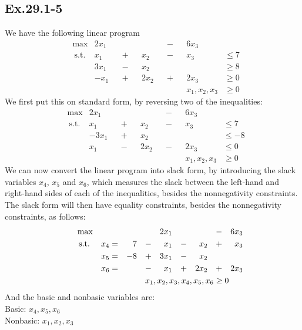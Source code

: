 \subsection*{Ex.29.1-5}

We have the following linear program
$$
\begin{aligned}
 & \max & 2x_1 && && && - && 6x_3 & 
\\
 & \ \text{s.t.} & x_1 && + && x_2 && - && x_3 & \leq 7
\\
 & & 3x_1 && - && x_2 && && & \geq 8
\\
 & & -x_1 && + && 2x_2 && + && 2x_3 & \geq 0
\\
 & & && && && && x_1,x_2,x_3 & \geq 0
\end{aligned}
$$
We first put this on standard form, by reversing two of the inequalities:
$$
\begin{aligned}
 & \max & 2x_1 && && && - && 6x_3 & 
\\
 & \ \text{s.t.} & x_1 && + && x_2 && - && x_3 & \leq 7
\\
 & & -3x_1 && + && x_2 && && & \leq -8
\\
 & & x_1 && - && 2x_2 && - && 2x_3 & \leq 0
\\
 & & && && && && x_1,x_2,x_3 & \geq 0
\end{aligned}
$$
We can now convert the linear program into slack form, by introducing the slack variables $x_4$, $x_5$ and $x_6$, which measures the slack between the left-hand and right-hand sides of each of the inequalities, besides the nonnegativity constraints.
\\
The slack form will then have equality constraints, besides the nonnegativity constraints, as follows:
$$
\begin{aligned}
 & \max & && && && 2x_1 && && && - && 6x_3
\\
 & \ \text{s.t.} & x_4 = && 7 && - && x_1 && - && x_2 && + && x_3 &
\\
 & & x_5 = && -8 && + && 3x_1 && - && x_2 && &&
\\
 & & x_6 = &&  && - && x_1 && + && 2x_2 && + && 2x_3
\\
 & & && && x_1,x_2,x_3,x_4,x_5,x_6 \geq 0 \span\span\span\span\span\span\span\span\span\span\span\span
\end{aligned}
$$
And the basic and nonbasic variables are:
\\
Basic: $x_4,x_5,x_6$
\\
Nonbasic: $x_1,x_2,x_3$